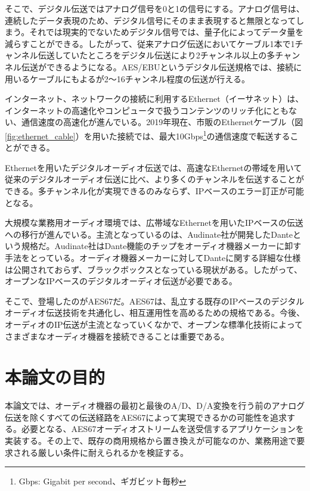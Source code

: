 そこで、デジタル伝送ではアナログ信号を0と1の信号にする。アナログ信号は、連続したデータ表現のため、デジタル信号にそのまま表現すると無限となってしまう。それでは現実的でないためデジタル信号では、量子化によってデータ量を減らすことができる\cite{analog-io}。したがって、従来アナログ伝送においてケーブル1本で1チャンネル伝送していたところをデジタル伝送により2チャンネル以上の多チャンネル伝送ができるようになる。AES/EBUというデジタル伝送規格では、接続に用いるケーブルにもよるが2〜16チャンネル程度の伝送が行える。

インターネット、ネットワークの接続に利用するEthernet（イーサネット）は、インターネットの高速化やコンピュータで扱うコンテンツのリッチ化にともない、通信速度の高速化が進んでいる。2019年現在、市販のEthernetケーブル（図\ref{fig:ethernet_cable}）を用いた接続では、最大10Gbps\footnote{Gbps: Gigabit per second、ギガビット毎秒}の通信速度で転送することができる。



Ethernetを用いたデジタルオーディオ伝送では、高速なEthernetの帯域を用いて従来のデジタルオーディオ伝送に比べ、より多くのチャンネルを伝送することができる。多チャンネル化が実現できるのみならず、IPベースのエラー訂正が可能となる。

大規模な業務用オーディオ環境では、広帯域なEthernetを用いたIPベースの伝送への移行が進んでいる。主流となっているのは、Audinate社が開発したDanteという規格だ。Audinate社はDante機能のチップをオーディオ機器メーカーに卸す手法をとっている。オーディオ機器メーカーに対してDanteに関する詳細な仕様は公開されておらず、ブラックボックスとなっている現状がある。したがって、オープンなIPベースのデジタルオーディオ伝送が必要である。

そこで、登場したのがAES67だ。AES67は、乱立する既存のIPベースのデジタルオーディオ伝送技術を共通化し、相互運用性を高めるための規格である。今後、オーディオのIP伝送が主流となっていくなかで、オープンな標準化技術によってさまざまなオーディオ機器を接続できることは重要である。

\section{本論文の目的}

本論文では、オーディオ機器の最初と最後のA/D、D/A変換を行う前のアナログ伝送を除くすべての伝送経路をAES67によって実現できるかの可能性を追求する。必要となる、AES67オーディオストリームを送受信するアプリケーションを実装する。その上で、既存の商用規格から置き換えが可能なのか、業務用途で要求される厳しい条件に耐えられるかを検証する。

